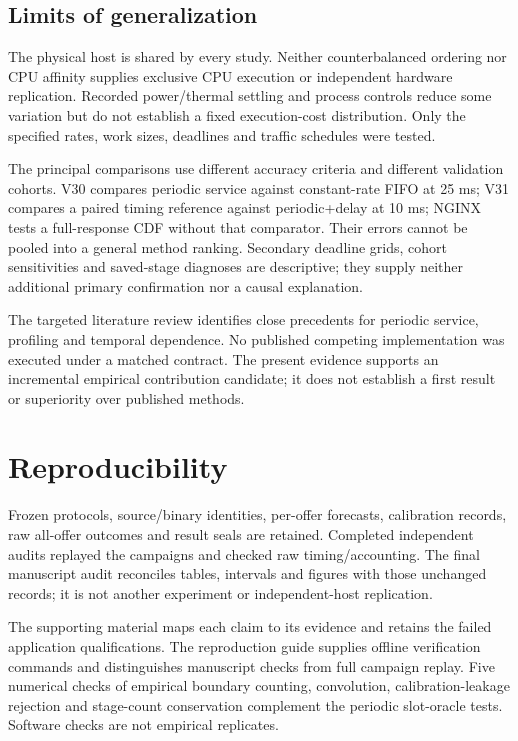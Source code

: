 \documentclass[11pt,a4paper]{article}
\begin{document}
\subsection{Limits of generalization}

The physical host is shared by every study. Neither counterbalanced ordering
nor CPU affinity supplies exclusive CPU execution or independent hardware
replication. Recorded power/thermal settling and process controls reduce some
variation but do not establish a fixed execution-cost distribution. Only the
specified rates, work sizes, deadlines and traffic schedules were tested.

The principal comparisons use different accuracy criteria and different
validation cohorts. V30 compares periodic service against constant-rate FIFO
at 25 ms; V31 compares a paired timing reference against periodic+delay at
10 ms; NGINX tests a full-response CDF without that comparator. Their errors
cannot be pooled into a general method ranking. Secondary deadline grids,
cohort sensitivities and saved-stage diagnoses are descriptive; they supply
neither additional primary confirmation nor a causal explanation.

The targeted literature review identifies close precedents for periodic service,
profiling and temporal dependence. No published competing implementation was
executed under a matched contract. The present evidence supports an incremental
empirical contribution candidate; it does not establish a first result or
superiority over published methods.

\section{Reproducibility}

Frozen protocols, source/binary identities, per-offer forecasts, calibration
records, raw all-offer outcomes and result seals are retained. Completed
independent audits replayed the campaigns and checked raw timing/accounting.
The final manuscript audit reconciles tables, intervals and figures with those
unchanged records; it is not another experiment or independent-host replication.

The supporting material maps each
claim to its evidence and retains the failed application qualifications. The
reproduction guide supplies offline
verification commands and distinguishes manuscript checks from full campaign
replay. Five numerical checks of empirical boundary counting, convolution,
calibration-leakage rejection and stage-count conservation complement the
periodic slot-oracle tests. Software checks are not empirical replicates.
\end{document}
